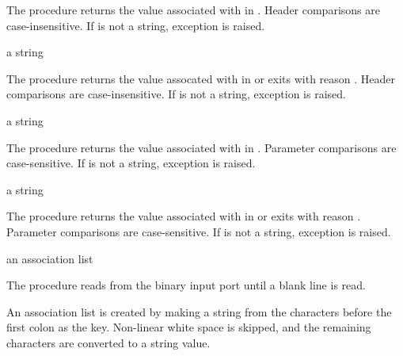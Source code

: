 The  procedure returns the value associated
with  in . Header comparisons are
case-insensitive. If  is not a string, exception
 is raised.

\begin{procedure}
\end{procedure}
\returns{} a string

The  procedure returns the value assocated
with  in  or exits with reason
. Header
comparisons are case-insensitive. If  is not a string,
exception  is raised.

\begin{procedure}
\end{procedure}
\returns{} a string \alt{} 

The  procedure returns the value associated
with  in . Parameter comparisons are
case-sensitive. If  is not a string, exception
 is raised.

\begin{procedure}
\end{procedure}
\returns{} a string

The  procedure returns the value associated
with  in  or exits with reason
. Parameter
comparisons are case-sensitive. If  is not a string,
exception  is raised.

\begin{procedure}
\end{procedure}
\returns{} an association list

The  procedure reads from the binary input
port  until a blank line is read.

An association list is created by making a string from the characters
before the first colon as the key. Non-linear white space is skipped,
and the remaining characters are converted to a string value.

